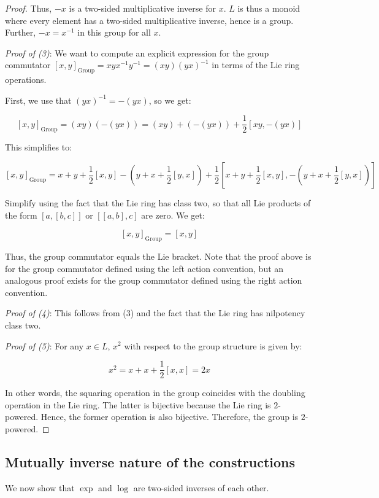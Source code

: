 \begin{proof}
  Thus, $-x$ is a two-sided multiplicative inverse for $x$. $L$ is
  thus a monoid where every element has a two-sided multiplicative
  inverse, hence is a group. Further, $-x = x^{-1}$ in this group for
  all $x$.

  {\em Proof of (3)}: We want to compute an explicit expression for
  the group commutator $[x,y]_{\text{Group}} = xyx^{-1}y^{-1} = (xy)(yx)^{-1}$ in
  terms of the Lie ring operations.

  First, we use that $(yx)^{-1} = -(yx)$, so we get:

  $$[x,y]_{\text{Group}} = (xy)(-(yx)) = (xy) + (-(yx)) + \frac{1}{2}[xy,-(yx)]$$

  This simplifies to:

  $$[x,y]_{\text{Group}} = x + y + \frac{1}{2}[x,y] - (y + x + \frac{1}{2}[y,x]) + \frac{1}{2}[x + y + \frac{1}{2}[x,y],-(y + x + \frac{1}{2}[y,x])]$$

  Simplify using the fact that the Lie ring has class two, so that all
  Lie products of the form $[a,[b,c]]$ or $[[a,b],c]$ are zero. We get:

  $$[x,y]_{\text{Group}} = [x,y]$$

  Thus, the group commutator equals the Lie bracket. Note that the
  proof above is for the group commutator defined using the left
  action convention, but an analogous proof exists for the group
  commutator defined using the right action convention.

  {\em Proof of (4)}: This follows from (3) and the fact that the Lie
  ring has nilpotency class two.

  {\em Proof of (5)}: For any $x \in L$, $x^2$ with respect to the
  group structure is given by:

  $$x^2 = x + x + \frac{1}{2}[x,x] = 2x$$

  In other words, the squaring operation in the group coincides with
  the doubling operation in the Lie ring. The latter is bijective
  because the Lie ring is $2$-powered. Hence, the former operation is
  also bijective. Therefore, the group is $2$-powered.
\end{proof}

\subsection{Mutually inverse nature of the constructions}

We now show that $\exp$ and $\log$ are two-sided inverses of each
other.

